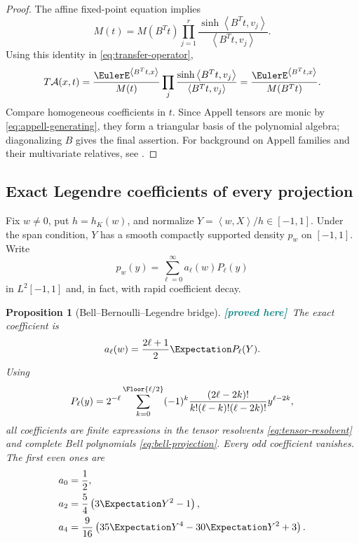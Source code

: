 \documentclass[11pt,oneside]{article}
\newtheorem{proposition}[theorem]{Proposition}
\theoremstyle{definition}
\theoremstyle{remark}
\newcommand{\ip}[2]{\left\langle #1,#2\right\rangle}
\newcommand{\New}{\textcolor{teal}{\textbf{[proved here]}}}
\begin{document}
\begin{proof}
The affine fixed-point equation implies
\begin{equation}
 M(t)=M(B^Tt)\prod_{j=1}^r
 \frac{\sinh\ip{B^Tt}{v_j}}{\ip{B^Tt}{v_j}}.
 \label{eq:mgf-mahler}
\end{equation}
Using this identity in \eqref{eq:transfer-operator},
\[
 T\mathcal A(x,t)
 =\frac{\EulerE^{\ip{B^Tt}{x}}}{M(t)}
  \prod_j\frac{\sinh\ip{B^Tt}{v_j}}{\ip{B^Tt}{v_j}}
 =\frac{\EulerE^{\ip{B^Tt}{x}}}{M(B^Tt)}.
\]
Compare homogeneous coefficients in $t$.  Since Appell tensors are monic by
\eqref{eq:appell-generating}, they form a triangular basis of the polynomial
algebra; diagonalizing $B$ gives the final assertion.  For background on Appell
families and their multivariate relatives, see \cite{Anshelevich}.
\end{proof}

\subsection{Exact Legendre coefficients of every projection}

Fix $w\ne0$, put $h=h_K(w)$, and normalize
$Y=\ip{w}{X}/h\in[-1,1]$.  Under the span condition, $Y$ has a smooth compactly
supported density $p_w$ on $[-1,1]$.  Write
\begin{equation}
 p_w(y)=\sum_{\ell=0}^{\infty}a_\ell(w)P_\ell(y)
 \label{eq:legendre-expansion}
\end{equation}
in $L^2[-1,1]$ and, in fact, with rapid coefficient decay.

\begin{proposition}[Bell--Bernoulli--Legendre bridge]
\label{prop:legendre}
\New\ The exact coefficient is
\begin{equation}
 a_\ell(w)=\frac{2\ell+1}{2}\Expectation P_\ell(Y).
 \label{eq:legendre-coefficient}
\end{equation}
Using
\begin{equation}
 P_\ell(y)=2^{-\ell}\sum_{k=0}^{\Floor{\ell/2}}
 (-1)^k\frac{(2\ell-2k)!}{k!(\ell-k)!(\ell-2k)!}
 y^{\ell-2k},
 \label{eq:legendre-monomial}
\end{equation}
all coefficients are finite expressions in the tensor resolvents
\eqref{eq:tensor-resolvent} and complete Bell polynomials
\eqref{eq:bell-projection}.  Every odd coefficient vanishes.  The first even
ones are
\begin{align}
 a_0&=\frac12,\nonumber\\
 a_2&=\frac54\left(3\Expectation Y^2-1\right),\nonumber\\
 a_4&=\frac9{16}\left(35\Expectation Y^4-30\Expectation Y^2+3\right).
 \label{eq:first-legendre}
\end{align}
\end{proposition}
\end{document}
